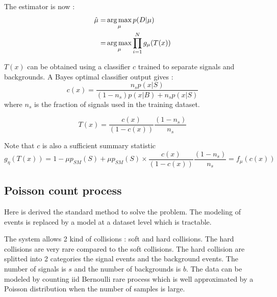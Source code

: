 The estimator is now :
\begin{align}
	\hat\mu =& \operatorname*{arg\,max}_\mu  p(D | \mu) \\
	     =& \operatorname*{arg\,max}_\mu  \prod_{i=1}^N g_\mu(T(x)) \\
\end{align}


$T(x)$ can be obtained using a classifier $c$ trained to separate signals and backgrounds.
A Bayes optimal classifier output gives :
\begin{equation}
	c(x) = \frac{n_s p(x|S)}{(1-n_s) p(x|B) + n_s p(x|S)}
\end{equation}
where $n_s$ is the fraction of signals used in the training dataset.

\begin{equation}
	T(x) = \frac{c(x)}{(1-c(x))} \frac{(1-n_s)}{n_s} 
\end{equation}


Note that $c$ is also a sufficient summary statistic
\begin{equation}
	g_\eta(T(x)) = 1 - \mu p_{SM}(S) + \mu p_{SM}(S) \times \frac{c(x)}{(1-c(x))} \frac{(1-n_s)}{n_s} = f_\mu(c(x))
\end{equation}












\subsection{Poisson count process} %
\label{sub:poisson_count_process}

Here is derived the standard method to solve the problem.
The modeling of events is replaced by a model at a dataset level which is tractable.

The system allows 2 kind of collisions : soft and hard collisions.
The hard collisions are very rare compared to the soft collisions.
The hard collision are splitted into 2 categories the signal events and the background events.
The number of signals is $s$ and the number of backgrounds is $b$.
The data can be modeled by counting iid Bernoulli rare process which is well approximated by a Poisson distribution \needcite when the number of samples is large.


